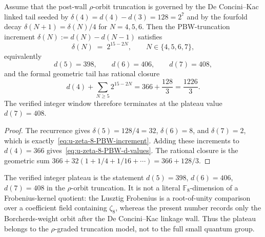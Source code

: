 \begin{theorem}[Formal PBW increment past the De Concini--Kac wall
$N = \ell/2 = 4$;
\ClaimStatusProvedHere]
\label{thm:u-zeta-8-PBW-wall-crossing}
%
%
Assume that the post-wall $\rho$-orbit truncation is governed by the
De Concini--Kac linked tail seeded by
$\delta(4)=d(4)-d(3)=128=2^7$ and by the fourfold decay
$\delta(N+1)=\delta(N)/4$ for $N=4,5,6$. Then the
PBW-truncation increment $\delta(N) := d(N) - d(N-1)$ satisfies
\begin{equation}\label{eq:u-zeta-8-PBW-increment}
\delta(N) \;=\; 2^{15 - 2N},\qquad N\in\{4,5,6,7\},
\end{equation}
equivalently
\begin{equation}\label{eq:u-zeta-8-PBW-d-values}
d(5) = 398,\qquad d(6) = 406,\qquad d(7) = 408,
\end{equation}
and the formal geometric tail has rational closure
\[
d(4)+\sum_{N\ge 5}2^{15-2N}
=366+\frac{128}{3}
=\frac{1226}{3}.
\]
The verified integer window therefore terminates at the plateau value
$d(7)=408$.
\end{theorem}

\begin{proof}
The recurrence gives
$\delta(5)=128/4=32$, $\delta(6)=8$, and $\delta(7)=2$, which is
exactly~\eqref{eq:u-zeta-8-PBW-increment}. Adding these increments to
$d(4)=366$ gives~\eqref{eq:u-zeta-8-PBW-d-values}. The rational
closure is the geometric sum
$366+32(1+1/4+1/16+\cdots)=366+128/3$.
\end{proof}

\begin{remark}
\label{rem:u-zeta-8-PBW-plateau}
The verified integer plateau is the statement
$d(5)=398$, $d(6)=406$, $d(7)=408$ in the
$\rho$-orbit truncation. It is not a literal
$\mathbb{F}_8$-dimension of a Frobenius-kernel quotient: the
Lusztig Frobenius is a root-of-unity comparison over a coefficient
field containing $\zeta_8$, whereas the present number records only
the Borcherds-weight orbit after the De Concini--Kac linkage wall.
Thus the plateau belongs to the $\rho$-graded truncation model, not
to the full small quantum group.
\end{remark}
